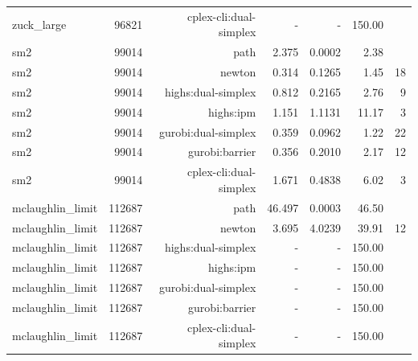 \begin{longtable}{lrrrrrr}
zuck\_large & 96821 & cplex-cli:dual-simplex & - & - & 150.00 &  \\
sm2 & 99014 & path & 2.375 & 0.0002 & 2.38 &  \\
sm2 & 99014 & newton & 0.314 & 0.1265 & 1.45 & 18 \\
sm2 & 99014 & highs:dual-simplex & 0.812 & 0.2165 & 2.76 & 9 \\
sm2 & 99014 & highs:ipm & 1.151 & 1.1131 & 11.17 & 3 \\
sm2 & 99014 & gurobi:dual-simplex & 0.359 & 0.0962 & 1.22 & 22 \\
sm2 & 99014 & gurobi:barrier & 0.356 & 0.2010 & 2.17 & 12 \\
sm2 & 99014 & cplex-cli:dual-simplex & 1.671 & 0.4838 & 6.02 & 3 \\
mclaughlin\_limit & 112687 & path & 46.497 & 0.0003 & 46.50 &  \\
mclaughlin\_limit & 112687 & newton & 3.695 & 4.0239 & 39.91 & 12 \\
mclaughlin\_limit & 112687 & highs:dual-simplex & - & - & 150.00 &  \\
mclaughlin\_limit & 112687 & highs:ipm & - & - & 150.00 &  \\
mclaughlin\_limit & 112687 & gurobi:dual-simplex & - & - & 150.00 &  \\
mclaughlin\_limit & 112687 & gurobi:barrier & - & - & 150.00 &  \\
mclaughlin\_limit & 112687 & cplex-cli:dual-simplex & - & - & 150.00 &  \\
\end{longtable}
